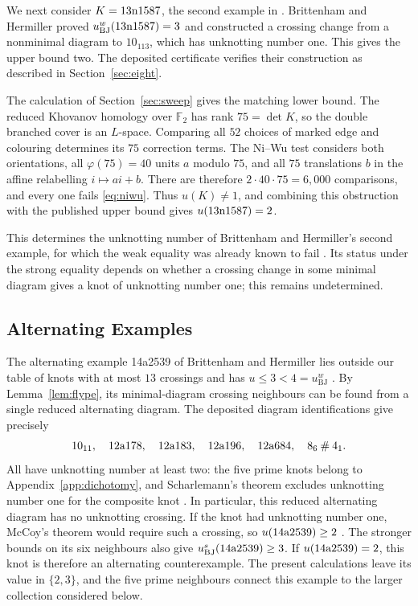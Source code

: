 \documentclass[12pt, oneside]{amsart}
\newcommand{\kn}[2]{\textup{#1#2}}
\begin{document}
We next consider $K=\kn{13n}{1587}$, the second example in \cite[\S3]{BH1705}.
Brittenham and Hermiller proved $u^w_{\mathrm{BJ}}(\kn{13n}{1587})=3$ and
constructed a crossing change from a nonminimal diagram to $10_{113}$, which
has unknotting number one. This gives the upper bound two. The deposited
certificate verifies their construction as described in Section~\ref{sec:eight}.

The calculation of Section~\ref{sec:sweep} gives the matching lower bound.
The reduced Khovanov homology over $\mathbb F_2$ has rank $75=\det K$, so the
double branched cover is an $L$-space. Comparing all $52$ choices of marked
edge and colouring determines its $75$ correction terms. The Ni--Wu test
considers both orientations, all $\varphi(75)=40$ units $a$ modulo $75$, and
all $75$ translations $b$ in the affine relabelling $i\mapsto ai+b$.
There are therefore $2\cdot40\cdot75=6{,}000$ comparisons, and every one
fails \eqref{eq:niwu}. Thus $u(K)\ne1$, and combining this obstruction
with the published upper bound gives $u(\kn{13n}{1587})=2$.

This determines the unknotting number of Brittenham and Hermiller's second
example, for which the weak equality was already known to fail
\cite[\S3]{BH1705}. Its status under the strong equality depends on whether
a crossing change in some minimal diagram gives a knot of unknotting number
one; this remains undetermined.

\subsection{Alternating Examples}\label{sec:minimal}

The alternating example \kn{14a}{2539} of Brittenham and Hermiller lies
outside our table of knots with at most $13$ crossings and has
$u\le3<4=u^w_{\mathrm{BJ}}$ \cite[\S3]{BH1705}. By Lemma~\ref{lem:flype},
its minimal-diagram crossing neighbours can be found from a single reduced
alternating diagram. The deposited diagram identifications give precisely
\[
    10_{11},\quad \kn{12a}{178},\quad \kn{12a}{183},\quad
    \kn{12a}{196},\quad \kn{12a}{684},\quad 8_6\mathbin{\#}4_1.
\]
All have unknotting number at least two: the five prime knots belong to
Appendix~\ref{app:dichotomy}, and Scharlemann's theorem excludes unknotting
number one for the composite knot \cite{Scharlemann}. In particular, this
reduced alternating diagram has no unknotting crossing. If the knot had
unknotting number one, McCoy's theorem would require such a crossing, so
$u(\kn{14a}{2539})\ge2$ \cite{McCoy}. The stronger bounds on its six
neighbours also give $u^s_{\mathrm{BJ}}(\kn{14a}{2539})\ge3$.
If $u(\kn{14a}{2539})=2$, this knot is therefore an alternating counterexample.
The present calculations leave
its value in $\{2,3\}$, and the five prime neighbours connect this example to
the larger collection considered below.
\end{document}
